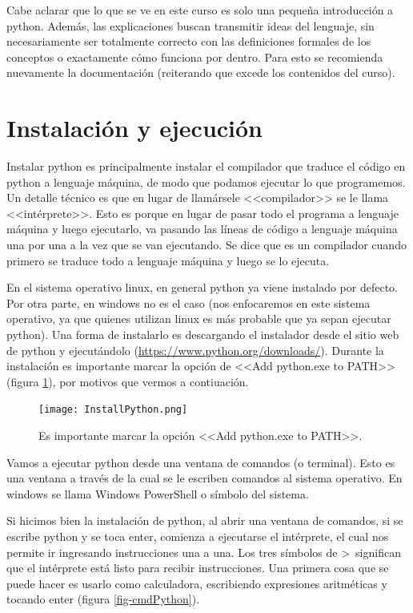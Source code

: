 \documentclass[a4paper, 12pt]{report}
\theoremstyle{definition}
\begin{document}
Cabe aclarar que lo que se ve en este curso es solo una pequeña introducción a python. Además, las explicaciones buscan transmitir ideas del lenguaje, sin necesariamente ser totalmente correcto con las definiciones formales de los conceptos o exactamente cómo funciona por dentro. Para esto se recomienda nuevamente la documentación (reiterando que excede los contenidos del curso).

\section{Instalación y ejecución}\label{sec-instalyEjec}

Instalar python es principalmente instalar el compilador que traduce el código en python a lenguaje máquina, de modo que podamos ejecutar lo que programemos. Un detalle técnico es que en lugar de llamársele <<compilador>> se le llama <<intérprete>>. Esto es porque en lugar de pasar todo el programa a lenguaje máquina y luego ejecutarlo, va pasando las líneas de código a lenguaje máquina una por una a la vez que se van ejecutando. Se dice que es un compilador cuando primero se traduce todo a lenguaje máquina y luego se lo ejecuta.

En el sistema operativo linux, en general python ya viene instalado por defecto. Por otra parte, en windows no es el caso (nos enfocaremos en este sistema operativo, ya que quienes utilizan linux es más probable que ya sepan ejecutar python). Una forma de instalarlo es descargando el instalador desde el sitio web de python y ejecutándolo (\href{https://www.python.org/downloads/}{https://www.python.org/downloads/}). Durante la instalación es importante marcar la opción de <<Add python.exe to PATH>> (figura \ref{fig-InstallPython}), por motivos que vermos a contiuación.

\begin{figure}
	\centering
	\texttt{[image: InstallPython.png]}
	\caption{Es importante marcar la opción <<Add python.exe to PATH>>.}
	\label{fig-InstallPython}
\end{figure}

Vamos a ejecutar python desde una ventana de comandos (o terminal). Esto es una ventana a través de la cual se le escriben comandos al sistema operativo. En windows se llama Windows PowerShell o símbolo del sistema.

Si hicimos bien la instalación de python, al abrir una ventana de comandos, si se escribe python y se toca enter, comienza a ejecutarse el intérprete, el cual nos permite ir ingresando instrucciones una a una. Los tres símbolos de >~significan que el intérprete está listo para recibir instrucciones. Una primera cosa que se puede hacer es usarlo como calculadora, escribiendo expresiones aritméticas y tocando enter (figura \ref{fig-cmdPython}).
\end{document}
